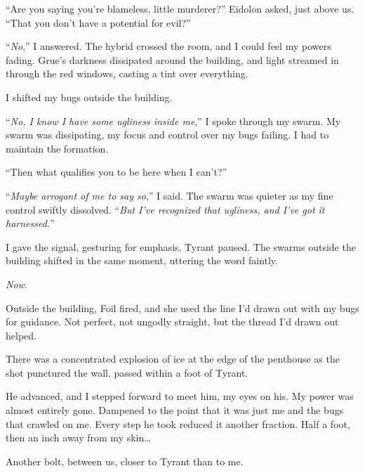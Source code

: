 ``Are you saying you're blameless, little murderer?'' Eidolon asked, just above us.  ``That you don't have a potential for evil?''



``\emph{No},'' I answered.  The hybrid crossed the room, and I could feel my powers fading.  Grue's darkness dissipated around the building, and light streamed in through the red windows, casting a tint over everything.



I shifted my bugs outside the building.



``\emph{No, I know I have some ugliness inside me},'' I spoke through my swarm.  My swarm was dissipating, my focus and control over my bugs failing.  I had to maintain the formation.



``Then what qualifies you to be here when I can't?''



``\emph{Maybe arrogant of me to say so},'' I said.  The swarm was quieter as my fine control swiftly dissolved.  ``\emph{But I've recognized that ugliness, and I've got it harnessed.}''



I gave the signal, gesturing for emphasis.  Tyrant paused.  The swarms outside the building shifted in the same moment, uttering the word faintly.



\emph{Now}.



Outside the building, Foil fired, and she used the line I'd drawn out with my bugs for guidance.  Not perfect, not ungodly straight, but the thread I'd drawn out helped.



There was a concentrated explosion of ice at the edge of the penthouse as the shot punctured the wall, passed within a foot of Tyrant.



He advanced, and I stepped forward to meet him, my eyes on his.  My power was almost entirely gone.  Dampened to the point that it was just me and the bugs that crawled on me.  Every step he took reduced it another fraction.  Half a foot, then an inch away from my skin\ldots



Another bolt, between us, closer to Tyrant than to me.



